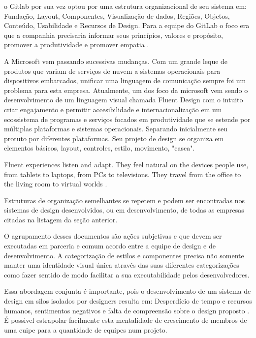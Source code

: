   o Gitlab por sua vez optou por uma estrutura organizacional de seu sistema em: Fundação, Layout, Componentes, Visualização de dados, Regiões, Objetos, Conteúdo, Usabilidade e Recursos de Design. Para a equipe do GitLab o foco era que a companhia precisaria informar seus princípios, valores e propósito, promover a produtividade e promover empatia \cite{gitlab_design}.

  A Microsoft vem passando sucessivas mudanças. Com um grande leque de produtos que variam de serviços de nuvem a sistemas operacionais para dispositivos embarcados, unificar uma linguagem de comunicação sempre foi um problema para esta empresa. Atualmente, um dos foco da microsoft vem sendo o desenvolvimento de um linguagem visual chamada Fluent Design com o intuito criar engajamento e permitir accesibilidade e internacionalização em um ecossistema de programas e serviços focados em produtividade que se estende por múltiplas plataformas e sistemas operacionais. Separando inicialmente seu protuto por diferentes plataformas. Seu projeto de design se organiza em elementos básicos, layout, controles, estilo, movimento, "casca".

\begin{citacao}[brazil]
  Fluent experiences listen and adapt. They feel natural on the devices people use, from tablets to laptops, from PCs to televisions. They travel from the office to the living room to virtual worlds \cite{microsoft_fluent}.
\end{citacao}

  Estruturas de organização semelhantes se repetem e podem ser encontradas nos sistemas de design desenvolvidos, ou em desenvolvimento, de todas as empresas citadas na listagem da seção anterior.

  O agrupamento desses documentos são ações subjetivas e que devem ser executadas em parceria e comum acordo entre a equipe de design e de desenvolvimento. A categorização de estilos e componentes precisa não somente manter uma identidade visual única através das suas diferentes categorizações como fazer sentido de modo facilitar a sua executabilidade pelos desenvolvedores.

  Essa abordagem conjunta é importante, pois o desenvolvimento de um sistema de design em silos isolados por designers resulta em: Desperdício  de tempo e recursos humanos, sentimentos negativos e falta de compreensão sobre o design proposto \cite{GuilhermeGonzalez}. É possivel estrapolar facilmente esta mentalidade de crescimento de membros de uma euipe para a quantidade de equipes num projeto.

